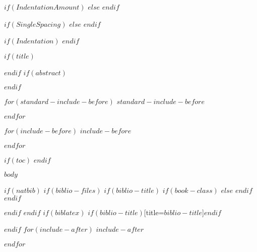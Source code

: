 \newlength{\maxheaderboth}
\setlength{\maxheaderboth}{\maxheader}
\ifthenelse{\lengthtest{\maxheaderfirst>\maxheader}}{\setlength{\maxheaderboth}{\maxheaderfirst}}{}

\newlength{\backup}
\setlength\backup{0pt}



\pagestyle{basicstyle}


\renewcommand*\familydefault{\sfdefault}
\normalfont
\ifthenelse{\lengthtest{\backup<0pt}}{\addtolength{\backup}{-2\baselineskip}\vspace*{\backup}\par}{}

\newlength{\myindentamount}
$if(IndentationAmount)$
\setlength{\myindentamount}{$IndentationAmount$}
$else$
\setlength{\myindentamount}{0.5in}
$endif$

$if(SingleSpacing)$
\setlength{\parskip}{\myfontsize}
$else$
\doublespacing
\setlength{\parindent}{\myindentamount}
\setlength{\RaggedRightParindent}{\parindent}
$endif$

$if(Indentation)$
\setlength{\parindent}{\myindentamount}
\setlength{\RaggedRightParindent}{\parindent}
$endif$

$if(title)$
\maketitle
$endif$
$if(abstract)$
\begin{abstract}
$abstract$
\end{abstract}
$endif$

$for(standard-include-before)$
$standard-include-before$

$endfor$

$for(include-before)$
$include-before$

$endfor$

$if(toc)$
{
\hypersetup{linkcolor=black}
\setcounter{tocdepth}{$toc-depth$}
\tableofcontents
}
$endif$
\thispagestyle{firststyle}

$body$

$if(natbib)$
$if(biblio-files)$
$if(biblio-title)$
$if(book-class)$
\renewcommand\bibname{$biblio-title$}
$else$
\renewcommand\refname{$biblio-title$}
$endif$
$endif$


$endif$
$endif$
$if(biblatex)$
\printbibliography$if(biblio-title)$[title=$biblio-title$]$endif$

$endif$
$for(include-after)$
$include-after$

$endfor$

